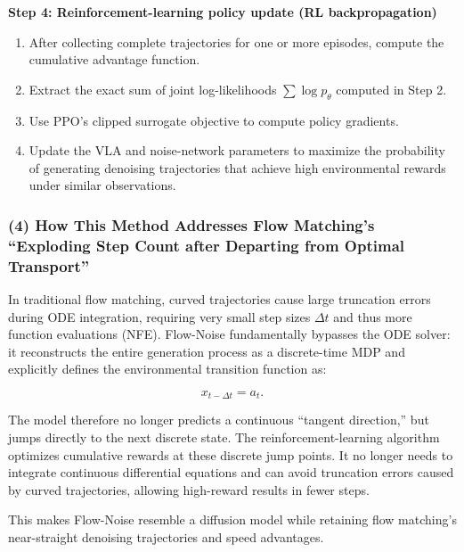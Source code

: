 \textbf{Step 4: Reinforcement-learning policy update (RL backpropagation)}

\begin{enumerate}
\def\labelenumi{\arabic{enumi}.}
\tightlist
\item
  After collecting complete trajectories for one or more episodes, compute the cumulative advantage function.
\item
  Extract the exact sum of joint log-likelihoods \(\sum\log p_\theta\) computed in Step 2.
\item
  Use PPO's clipped surrogate objective to compute policy gradients.
\item
  Update the VLA and noise-network parameters to maximize the probability of generating denoising trajectories that achieve high environmental rewards under similar observations.
\end{enumerate}

\hypertarget{how-this-method-addresses-flow-matchings-exploding-step-count-after-departing-from-optimal-transport}{%
\subsubsection{(4) How This Method Addresses Flow Matching's ``Exploding Step Count after Departing from Optimal Transport''}\label{how-this-method-addresses-flow-matchings-exploding-step-count-after-departing-from-optimal-transport}}

In traditional flow matching, curved trajectories cause large truncation errors during ODE integration, requiring very small step sizes \(\Delta t\) and thus more function evaluations (NFE). Flow-Noise fundamentally bypasses the ODE solver: it reconstructs the entire generation process as a discrete-time MDP and explicitly defines the environmental transition function as:

\[
x_{t-\Delta t}=a_t.
\]

The model therefore no longer predicts a continuous ``tangent direction,'' but jumps directly to the next discrete state. The reinforcement-learning algorithm optimizes cumulative rewards at these discrete jump points. It no longer needs to integrate continuous differential equations and can avoid truncation errors caused by curved trajectories, allowing high-reward results in fewer steps.

This makes Flow-Noise resemble a diffusion model while retaining flow matching's near-straight denoising trajectories and speed advantages.

